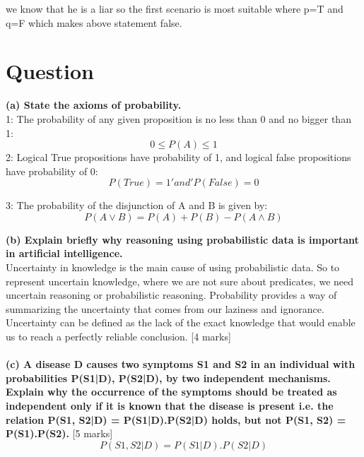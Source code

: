 \documentclass[12pt,a4paper]{article}
\begin{document}
{	we know that he is a liar so the first scenario is most suitable where p=T and q=F which makes above statement false.
	


\newpage

		
	\section{Question}
	
    \textbf{(a)	State the axioms of probability.}\\
    1: The probability of any given proposition is no less than 0 and no bigger than 1:
    	\begin{equation*}
    	0\leqslant P(A) \leqslant 1
    	\end{equation*}
    2: Logical True propositions have probability of 1, and logical false propositions have probability of 0:
  \begin{equation*}
  P(True) = 1   'and'   P(False) = 0
  \end{equation*}
  
    3: The probability of the disjunction of A and B is given by:
  \begin{equation*}
  P(A \lor B) = P(A) + P(B) - P(A \land B)
  \end{equation*}
    

	\textbf{(b)	Explain briefly why reasoning using probabilistic data is important in artificial intelligence.}\\
	Uncertainty in knowledge  is the main cause of using probabilistic data. So to represent uncertain knowledge, where we are not sure about predicates, we need uncertain reasoning or probabilistic reasoning. Probability provides a way of summarizing the uncertainty that comes from our laziness
	and ignorance. Uncertainty can be defined as the lack of the exact knowledge that would enable
	us to reach a perfectly reliable conclusion.
	[4 marks]\\
	\\
	\textbf{(c)	A disease D causes two symptoms S1 and S2 in an individual with probabilities P(S1|D), P(S2|D), by two independent mechanisms. Explain why the occurrence of the symptoms should be treated as independent only if it is known that the disease is present i.e. the relation P(S1, S2|D) = P(S1|D).P(S2|D) holds, but not P(S1, S2) = P(S1).P(S2).}
	[5 marks]\\
	
	
	\begin{equation*}
	P(S1,S2|D) = P(S1|D).P(S2|D)
	\end{equation*}
	
}
\end{document}
